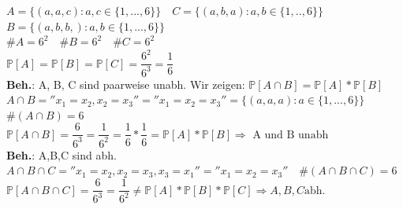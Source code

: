 $A = \{(a,a,c):a,c \in \{1,...,6\}\}  \quad C = \{(a,b,a):a,b\in \{1,..,6\}\} $\\
$B = \{(a,b,b,): a,b \in \{1,...,6\}\}$\\$\#A=6^2\quad \# B= 6^2 \quad \#C=6^2$\medskip\\
$\mathds{P}[A] = \mathds{P}[B]=\mathds{P}[C]=\dfrac{6^2}{6^3} = \dfrac{1}{6}$\\
\textbf{Beh.}: A, B, C sind paarweise unabh. Wir zeigen: $\mathds{P}[A \cap B] = \mathds{P}[A] * \mathds{P}[B]$\smallskip\\
$A \cap B = ''x_1 = x_2, x_2 = x_3'' = ''x_1 = x_2 =x_3'' = \{(a,a,a):a \in \{1,...,6\}\} $\\$ \#(A\cap B) = 6$\smallskip\\
$\mathds{P}[A\cap B] = \dfrac{6}{6^3} = \dfrac{1}{6^2} = \dfrac{1}{6}* \dfrac{1}{6}= \mathds{P}[A]*\mathds{P}[B] \Rightarrow \text{ A und B unabh}$\medskip\\
\textbf{Beh.}: A,B,C sind abh. \\$A \cap B \cap C = ''x_1 = x_2, x_2 =x_3, x_3 = x_1'' = ''x_1 = x_2 =x_3'' \quad \#(A\cap B \cap C) = 6$\smallskip\\
$\mathds{P}[A \cap B \cap C]= \dfrac{6}{6^3} = \dfrac{1}{6^2} \neq \mathds{P}[A]*\mathds{P}[B]*\mathds{P}[C] \Rightarrow A,B,C \text{abh.}$
